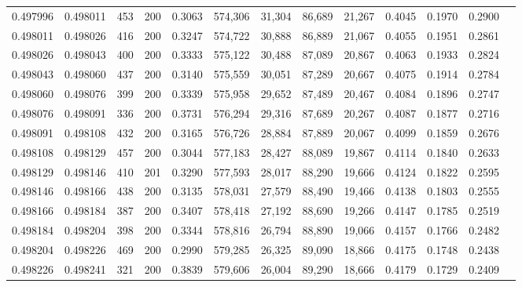 \begin{tabular}{rrrrrrrrrrrrr}
0.497996 & 0.498011 &   453 & 200 &                                     0.3063 & 574,306 &  31,304 &  86,689 &  21,267 & 0.4045 & 0.1970 & 0.2900 \\
0.498011 & 0.498026 &   416 & 200 &                                     0.3247 & 574,722 &  30,888 &  86,889 &  21,067 & 0.4055 & 0.1951 & 0.2861 \\
0.498026 & 0.498043 &   400 & 200 &                                     0.3333 & 575,122 &  30,488 &  87,089 &  20,867 & 0.4063 & 0.1933 & 0.2824 \\
0.498043 & 0.498060 &   437 & 200 &                                     0.3140 & 575,559 &  30,051 &  87,289 &  20,667 & 0.4075 & 0.1914 & 0.2784 \\
0.498060 & 0.498076 &   399 & 200 &                                     0.3339 & 575,958 &  29,652 &  87,489 &  20,467 & 0.4084 & 0.1896 & 0.2747 \\
0.498076 & 0.498091 &   336 & 200 &                                     0.3731 & 576,294 &  29,316 &  87,689 &  20,267 & 0.4087 & 0.1877 & 0.2716 \\
0.498091 & 0.498108 &   432 & 200 &                                     0.3165 & 576,726 &  28,884 &  87,889 &  20,067 & 0.4099 & 0.1859 & 0.2676 \\
0.498108 & 0.498129 &   457 & 200 &                                     0.3044 & 577,183 &  28,427 &  88,089 &  19,867 & 0.4114 & 0.1840 & 0.2633 \\
0.498129 & 0.498146 &   410 & 201 &                                     0.3290 & 577,593 &  28,017 &  88,290 &  19,666 & 0.4124 & 0.1822 & 0.2595 \\
0.498146 & 0.498166 &   438 & 200 &                                     0.3135 & 578,031 &  27,579 &  88,490 &  19,466 & 0.4138 & 0.1803 & 0.2555 \\
0.498166 & 0.498184 &   387 & 200 &                                     0.3407 & 578,418 &  27,192 &  88,690 &  19,266 & 0.4147 & 0.1785 & 0.2519 \\
0.498184 & 0.498204 &   398 & 200 &                                     0.3344 & 578,816 &  26,794 &  88,890 &  19,066 & 0.4157 & 0.1766 & 0.2482 \\
0.498204 & 0.498226 &   469 & 200 &                                     0.2990 & 579,285 &  26,325 &  89,090 &  18,866 & 0.4175 & 0.1748 & 0.2438 \\
0.498226 & 0.498241 &   321 & 200 &                                     0.3839 & 579,606 &  26,004 &  89,290 &  18,666 & 0.4179 & 0.1729 & 0.2409 \\

\end{tabular}
